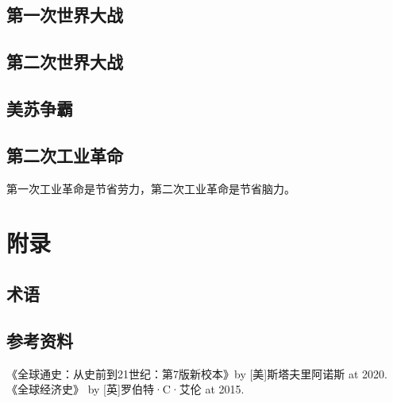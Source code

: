 \documentclass[12pt,oneside]{book}
\begin{document}
\chapter{第一次世界大战}


\chapter{第二次世界大战}

\chapter{美苏争霸}


\chapter{第二次工业革命}
第一次工业革命是节省劳力，第二次工业革命是节省脑力。





\appendix
\part{附录}
\chapter{术语}



\backmatter
\chapter*{参考资料}
\begin{thebibliography}{99}
 《全球通史：从史前到21世纪：第7版新校本》by [美]斯塔夫里阿诺斯 at 2020.
 《全球经济史》 by [英]罗伯特·C·艾伦 at 2015.

\end{thebibliography}
\end{document}
